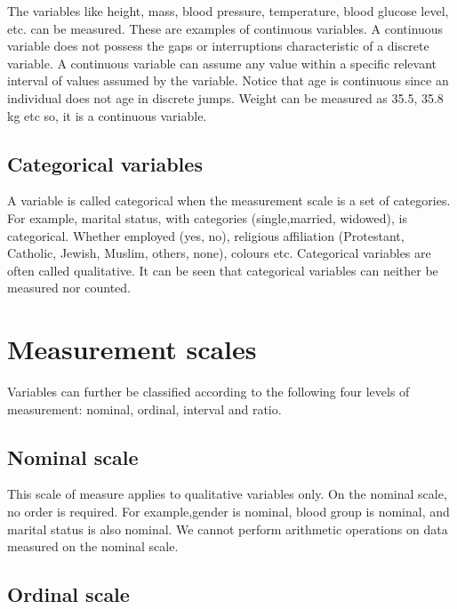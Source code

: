 \documentclass[
]{book}
\begin{document}
The variables like height, mass, blood pressure, temperature, blood glucose level, etc. can be measured. These are examples of continuous variables. A continuous variable does not possess the gaps or interruptions characteristic of a discrete variable. A continuous
variable can assume any value within a specific relevant interval of values assumed by the variable. Notice that age is continuous since an individual does not age in discrete jumps. Weight can be measured as 35.5, 35.8 kg etc so, it is a continuous variable.

\hypertarget{categorical-variables}{%
\subsection{Categorical variables}\label{categorical-variables}}

A variable is called categorical when the measurement scale is a set of categories. For example, marital status, with categories (single,married, widowed), is categorical. Whether employed (yes, no), religious affiliation (Protestant, Catholic, Jewish, Muslim, others, none),
colours etc. Categorical variables are often called qualitative. It can be seen that categorical variables can neither be measured nor counted.

\hypertarget{measurement-scales}{%
\section{Measurement scales}\label{measurement-scales}}

Variables can further be classified according to the following four levels of measurement: nominal, ordinal, interval and ratio.

\hypertarget{nominal-scale}{%
\subsection{Nominal scale}\label{nominal-scale}}

This scale of measure applies to qualitative variables only. On the nominal scale, no order is required. For example,gender is nominal, blood group is nominal, and marital status is also nominal. We cannot perform arithmetic operations on data measured on the nominal scale.

\hypertarget{ordinal-scale}{%
\subsection{Ordinal scale}\label{ordinal-scale}}
\end{document}
